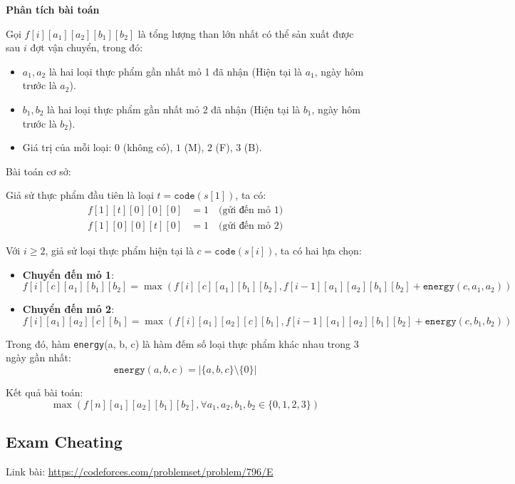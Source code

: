 \documentclass{article}
\begin{document}
\textbf{Phân tích bài toán}

Gọi $f[i][a_1][a_2][b_1][b_2]$ là tổng lượng than lớn nhất có thể sản xuất được sau $i$ đợt vận chuyển, trong đó:
\begin{itemize}
    \item $a_1, a_2$ là hai loại thực phẩm gần nhất mỏ 1 đã nhận (Hiện tại là $a_1$, ngày hôm trước là $a_2$).
    \item $b_1, b_2$ là hai loại thực phẩm gần nhất mỏ 2 đã nhận (Hiện tại là $b_1$, ngày hôm trước là $b_2$).
    \item Giá trị của mỗi loại: $0$ (không có), $1$ (M), $2$ (F), $3$ (B).
\end{itemize}

Bài toán cơ sở:

Giả sử thực phẩm đầu tiên là loại $t = \texttt{code}(s[1])$, ta có:
\begin{align*}
f[1][t][0][0][0] &= 1 \quad \text{(gửi đến mỏ 1)} \\
f[1][0][0][t][0] &= 1 \quad \text{(gửi đến mỏ 2)}
\end{align*}

Với $i \geq 2$, giả sử loại thực phẩm hiện tại là $c = \texttt{code}(s[i])$, ta có hai lựa chọn:

\begin{itemize}
    \item \textbf{Chuyển đến mỏ 1}:
    \[
    f[i][c][a_1][b_1][b_2] = \max(f[i][c][a_1][b_1][b_2], f[i - 1][a_1][a_2][b_1][b_2] + \texttt{energy}(c, a_1, a_2))
    \]
    
    \item \textbf{Chuyển đến mỏ 2}:
    \[
    f[i][a_1][a_2][c][b_1] = \max(f[i][a_1][a_2][c][b_1], f[i - 1][a_1][a_2][b_1][b_2] + \texttt{energy}(c, b_1, b_2))
    \]
\end{itemize}

Trong đó, hàm \texttt{energy}(a, b, c) là hàm đếm số loại thực phẩm khác nhau trong 3 ngày gần nhất:
\[
\texttt{energy}(a, b, c) = \left| \{a, b, c\} \setminus \{0\} \right|
\]


Kết quả bài toán:
\[\boxed{
\max(
f[n][a_1][a_2][b_1][b_2], \forall a_1, a_2, b_1, b_2 \in \{0,1,2,3\})}
\]

\subsection{Exam Cheating}
Link bài: \url{https://codeforces.com/problemset/problem/796/E}
\end{document}
